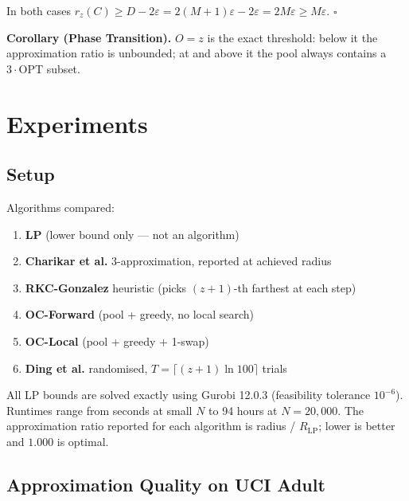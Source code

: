 \documentclass[11pt]{article}
\begin{document}
In both cases $r_z(C) \ge D - 2\varepsilon = 2(M+1)\varepsilon - 2\varepsilon = 2M\varepsilon \ge M\varepsilon$. \hfill$\square$

\textbf{Corollary (Phase Transition).} $O = z$ is the exact threshold: below it the approximation ratio is unbounded; at and above it the pool always contains a $3 \cdot \mathrm{OPT}$ subset.


\section{Experiments}

\subsection{Setup}

Algorithms compared:
\begin{enumerate}
    \item \textbf{LP} (lower bound only --- not an algorithm)
    \item \textbf{Charikar et al.} 3-approximation, reported at achieved radius
    \item \textbf{RKC-Gonzalez} heuristic (picks $(z{+}1)$-th farthest at each step)
    \item \textbf{OC-Forward} (pool + greedy, no local search)
    \item \textbf{OC-Local} (pool + greedy + 1-swap)
    \item \textbf{Ding et al.} randomised, $T = \lceil(z{+}1)\ln 100\rceil$ trials
\end{enumerate}

All LP bounds are solved exactly using Gurobi 12.0.3 (feasibility tolerance $10^{-6}$). Runtimes range from seconds at small $N$ to 94 hours at $N = 20{,}000$. The approximation ratio reported for each algorithm is radius / $R_\mathrm{LP}$; lower is better and $1.000$ is optimal.

\subsection{Approximation Quality on UCI Adult}
\end{document}
